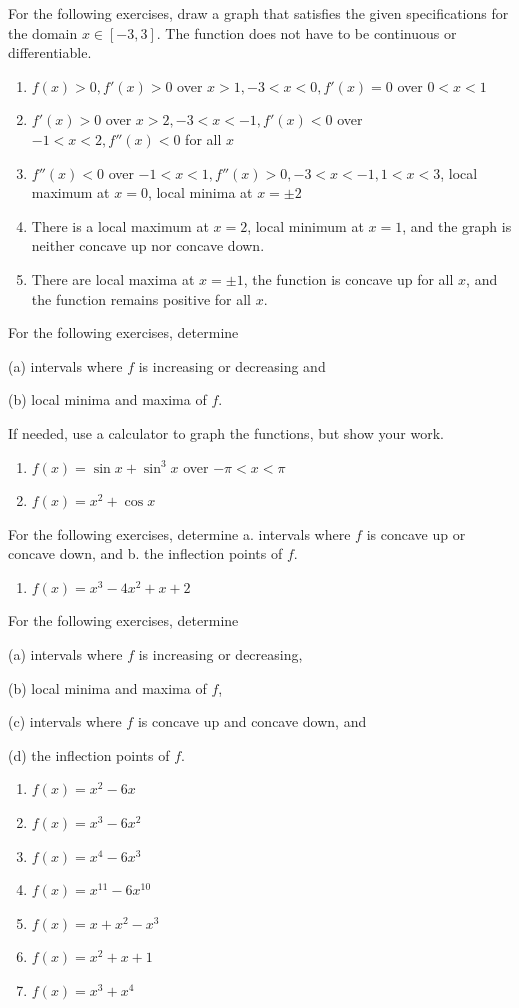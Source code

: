 \documentclass{exercises}
\begin{document}
For the following exercises, draw a graph that satisfies the given specifications for the domain $x\in[-3,3]$. The function does not have to be continuous or differentiable.

\begin{enumerate}[resume]
\item $f(x)>0,f'(x)>0$ over $x>1,-3<x<0,f'(x)=0$ over $0<x<1$
\item $f'(x)>0$ over $x>2,-3<x<-1,f'(x)<0$ over $-1<x<2,f''(x)<0$ for all $x$
\item $f''(x)<0$ over $-1<x<1,f''(x)>0,-3<x<-1,1<x<3$, local maximum at $x=0$, local minima at $x=\pm2$
\item There is a local maximum at $x=2$, local minimum at $x=1$, and the graph is neither concave up nor concave down.
\item There are local maxima at $x=\pm1$, the function is concave up for all $x$, and the function remains positive for all $x$.
\end{enumerate}

For the following exercises, determine


(a) intervals where $f$ is increasing or decreasing and


(b) local minima and maxima of $f$.


If needed, use a calculator to graph the functions, but show your work.

\begin{enumerate}[resume]
\item $f(x)=\sin x+\sin^{3}x$ over $-\pi<x<\pi$
\item $f(x)=x^{2}+\cos x$
\end{enumerate}

For the following exercises, determine a. intervals where $f$ is concave up or concave down, and b. the inflection points of $f$.

\begin{enumerate}[resume]
\item $f(x)=x^{3}-4x^{2}+x+2$
\end{enumerate}

For the following exercises, determine


(a) intervals where $f$ is increasing or decreasing,


(b) local minima and maxima of $f$,


(c) intervals where $f$ is concave up and concave down, and


(d) the inflection points of $f$.

\begin{enumerate}[resume]
\item $f(x)=x^{2}-6x$
\item $f(x)=x^{3}-6x^{2}$
\item $f(x)=x^{4}-6x^{3}$
\item $f(x)=x^{11}-6x^{10}$
\item $f(x)=x+x^{2}-x^{3}$
\item $f(x)=x^{2}+x+1$
\item $f(x)=x^{3}+x^{4}$
\end{enumerate}
\end{document}
